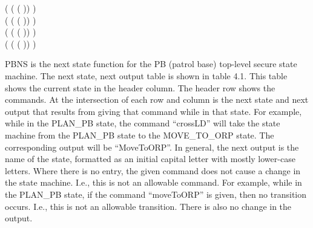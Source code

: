 \begin{itemize}
\begin{itemize}
   (  ( ( )) \HOLSymConst{=} ) \HOLSymConst{\HOLTokenConj{}}\ \\
   (  ( ( )) \HOLSymConst{=} ) \HOLSymConst{\HOLTokenConj{}}\ \\
   (  ( ( )) \HOLSymConst{=} ) \HOLSymConst{\HOLTokenConj{}}\ \\ (  ( ( )) \HOLSymConst{=} )
 \end{itemize}
 PBNS is the next state function for the PB (patrol base) top-level secure state machine.
 The next state, next output table is shown in table 4.1. This table shows the current state in the header column. The
 header row shows the commands. At the intersection of each row and column is the next
 state and next output that results from giving that command while in that state. For
 example, while in the PLAN_PB state, the command “crossLD” will take the state machine
 from the PLAN_PB state to the MOVE_TO_ORP state. The corresponding output will be
 “MoveToORP”. In general, the next output is the name of the state, formatted as an
 initial capital letter with mostly lower-case letters. Where there is no entry, the
 given command does not cause a change in the state machine. I.e., this is not an
 allowable command. For example, while in the PLAN_PB state, if the command “moveToORP”
 is given, then no transition occurs. I.e., this is not an allowable transition.
 There is also no change in the output.\\\\
 

\end{itemize}
